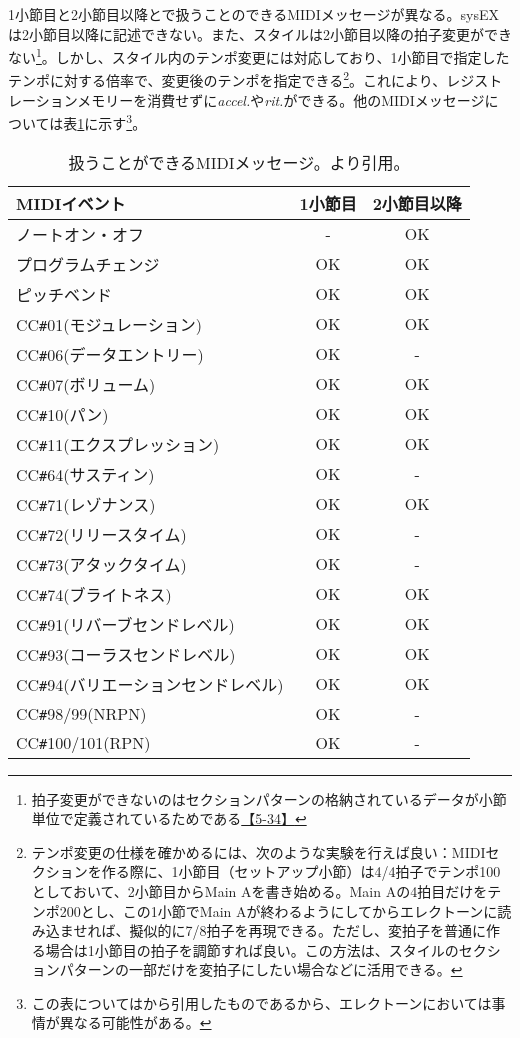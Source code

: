 \documentclass[uplatex, 10pt, dvipdfmx]{jsarticle}
\numberwithin{equation}{section}
\begin{document}
1小節目と2小節目以降とで扱うことのできるMIDIメッセージが異なる\cite{style}。sysEXは2小節目以降に記述できない。また、スタイルは2小節目以降の拍子変更ができない\footnote{拍子変更ができないのはセクションパターンの格納されているデータが小節単位で定義されているためである\href{http://els01stylefile.music.coocan.jp/Stagea_Style/Stagea_Style_P34.htm}{【5-34】}}。しかし、スタイル内のテンポ変更には対応しており、1小節目で指定したテンポに対する倍率で、変更後のテンポを指定できる\footnote{テンポ変更の仕様を確かめるには、次のような実験を行えば良い：MIDIセクションを作る際に、1小節目（セットアップ小節）は4/4拍子でテンポ100としておいて、2小節目からMain Aを書き始める。Main Aの4拍目だけをテンポ200とし、この1小節でMain Aが終わるようにしてからエレクトーンに読み込ませれば、擬似的に7/8拍子を再現できる。ただし、変拍子を普通に作る場合は1小節目の拍子を調節すれば良い。この方法は、スタイルのセクションパターンの一部だけを変拍子にしたい場合などに活用できる。}。これにより、レジストレーションメモリーを消費せずに\textit{accel.}や\textit{rit.}ができる。他のMIDIメッセージについては表\ref{1bar2bar}に示す\footnote{この表については\cite{style}から引用したものであるから、エレクトーンにおいては事情が異なる可能性がある。}。



\begin{table}[h]
\caption{扱うことができるMIDIメッセージ。\cite{style}より引用。}
\label{1bar2bar}
\centering
\begin{tabular}{|l|c|c|}
\hline
MIDIイベント & 1小節目 & 2小節目以降\\
\hline
\hline
ノートオン・オフ & - & OK \\ \hline 
プログラムチェンジ & OK & OK \\ \hline
ピッチベンド & OK & OK \\ \hline
CC\texttt{\#}01(モジュレーション) & OK & OK \\ \hline
CC\texttt{\#}06(データエントリー) & OK & - \\ \hline
CC\texttt{\#}07(ボリューム) & OK & OK \\ \hline
CC\texttt{\#}10(パン) & OK & OK \\ \hline
CC\texttt{\#}11(エクスプレッション) & OK & OK \\ \hline
CC\texttt{\#}64(サスティン) & OK & - \\ \hline
CC\texttt{\#}71(レゾナンス) & OK & OK \\ \hline
CC\texttt{\#}72(リリースタイム) & OK & - \\ \hline
CC\texttt{\#}73(アタックタイム) & OK & - \\ \hline
CC\texttt{\#}74(ブライトネス) & OK & OK \\ \hline
CC\texttt{\#}91(リバーブセンドレベル) & OK & OK \\ \hline
CC\texttt{\#}93(コーラスセンドレベル) & OK & OK \\ \hline
CC\texttt{\#}94(バリエーションセンドレベル) & OK & OK \\ \hline
CC\texttt{\#}98/99(NRPN) & OK & - \\ \hline
CC\texttt{\#}100/101(RPN) & OK & - \\ \hline
\end{tabular}
\end{table}
\end{document}
